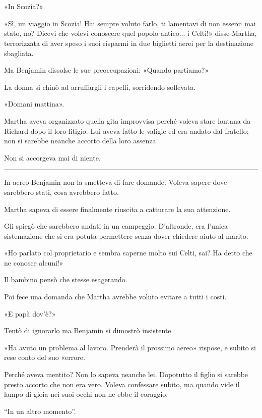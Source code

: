 \chapter{}
\label{ch:2}

«In Scozia?»

«Sì, un viaggio in Scozia! Hai sempre voluto farlo, ti lamentavi di non esserci mai stato, no?
Dicevi che volevi conoscere quel popolo antico... i Celti!» disse Martha, terrorizzata di aver speso
i suoi risparmi in due biglietti aerei per la destinazione sbagliata.

Ma Benjamin dissolse le sue preoccupazioni: «Quando partiamo?»

La donna si chinò ad arruffargli i capelli, sorridendo sollevata.

«Domani mattina».

Martha aveva organizzato quella gita improvvisa perché voleva stare lontana da Richard dopo il loro
litigio. Lui aveva fatto le valigie ed era andato dal fratello; non si sarebbe neanche accorto della
loro assenza.

Non si accorgeva mai di niente.

\plainbreak{1}

In aereo Benjamin non la smetteva di fare domande. Voleva sapere dove sarebbero stati, cosa
avrebbero fatto.

Martha sapeva di essere finalmente riuscita a catturare la sua attenzione.

Gli spiegò che sarebbero andati in un campeggio. D'altronde, era l'unica sistemazione che si era
potuta permettere senza dover chiedere aiuto al marito.

«Ho parlato col proprietario e sembra saperne molto sui Celti, sai? Ha detto che ne conosce alcuni!»

Il bambino pensò che stesse esagerando.

Poi fece una domanda che Martha avrebbe voluto evitare a tutti i costi.

«E papà dov'è?»

Tentò di ignorarlo ma Benjamin si dimostrò insistente.

«Ha avuto un problema al lavoro. Prenderà il prossimo aereo» rispose, e subito si rese conto del suo
«errore.

Perché aveva mentito? Non lo sapeva neanche lei. Dopotutto il figlio si sarebbe presto accorto che
non era vero. Voleva confessare subito, ma quando vide il lampo di gioia nei suoi occhi non ne ebbe
il coraggio.

``In un altro momento''.

